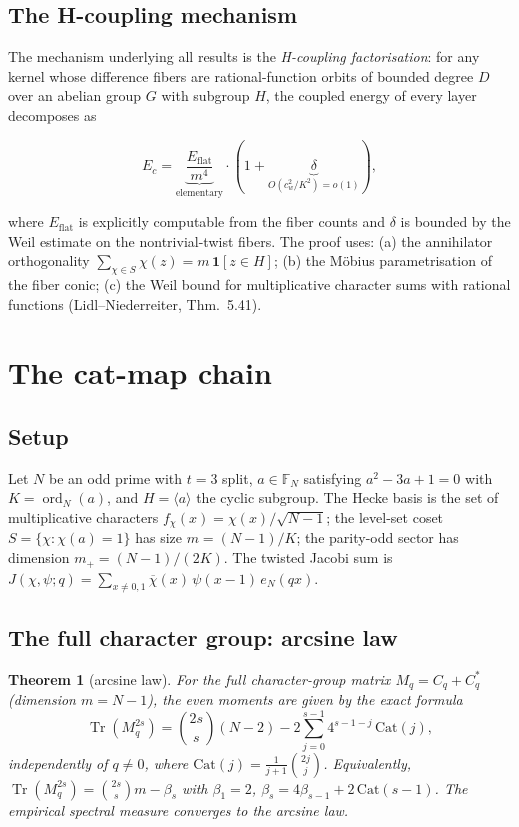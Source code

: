 \documentclass[11pt]{article}
\newtheorem{theorem}{Theorem}[section]
\begin{document}
\subsection{The H-coupling mechanism}

The mechanism underlying all results is the \emph{H-coupling
factorisation}: for any kernel whose difference fibers are
rational-function orbits of bounded degree $D$ over an abelian group
$G$ with subgroup $H$, the coupled energy of every layer decomposes
as

\[
  E_c = \underbrace{\frac{E_{\mathrm{flat}}}{m^4}}_{\text{elementary}}
      \cdot (1 + \underbrace{\delta}_{O(c_w^2/K^2) = o(1)}),
\]

where $E_{\mathrm{flat}}$ is explicitly computable from the fiber
counts and $\delta$ is bounded by the Weil estimate on the
nontrivial-twist fibers.  The proof uses: (a) the annihilator
orthogonality $\sum_{\chi \in S} \chi(z) = m\,\mathbf{1}[z \in H]$;
(b) the M\"obius parametrisation of the fiber conic; (c) the
Weil bound for multiplicative character sums with rational functions
(Lidl--Niederreiter, Thm.~5.41).

\section{The cat-map chain}\label{sec:catmap}\label{sec:catmap}

\subsection{Setup}

Let $N$ be an odd prime with $t = 3$ split, $a \in \mathbb{F}_N$
satisfying $a^2 - 3a + 1 = 0$ with $K = \operatorname{ord}_N(a)$, and
$H = \langle a\rangle$ the cyclic subgroup.  The Hecke basis is the
set of multiplicative characters $f_\chi(x) = \chi(x)/\sqrt{N-1}$;
the level-set coset $S = \{\chi: \chi(a) = 1\}$ has size
$m = (N{-}1)/K$; the parity-odd sector has dimension
$m_+ = (N{-}1)/(2K)$.  The twisted Jacobi sum is
$J(\chi,\psi;q) = \sum_{x \neq 0,1} \overline{\chi}(x)\,
\psi(x{-}1)\,e_N(qx)$.

\subsection{The full character group: arcsine law}\label{sec:arcsine}

\begin{theorem}[arcsine law]\label{thm:arcsine}
For the full character-group matrix $M_q = C_q + C_q^*$ (dimension
$m = N{-}1$), the even moments are given by the exact formula
\[
  \operatorname{Tr}(M_q^{2s}) = \binom{2s}{s}(N{-}2)
  - 2\sum_{j=0}^{s-1} 4^{s-1-j}\,\mathrm{Cat}(j),
\]
independently of $q \neq 0$, where
$\mathrm{Cat}(j) = \frac{1}{j+1}\binom{2j}{j}$.  Equivalently,
$\operatorname{Tr}(M_q^{2s}) = \binom{2s}{s}m - \beta_s$ with
$\beta_1 = 2$, $\beta_s = 4\beta_{s-1} + 2\,\mathrm{Cat}(s{-}1)$.
The empirical spectral measure converges to the arcsine law.
\end{theorem}
\end{document}
